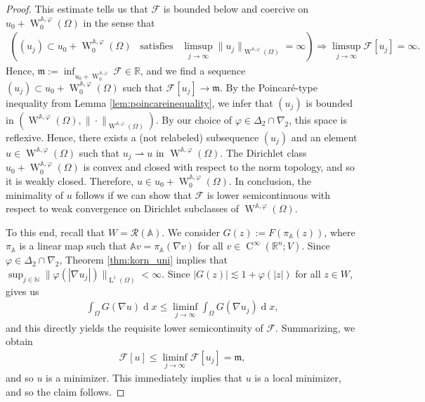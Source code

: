 \documentclass[a4paper,11pt]{amsart}
\numberwithin{equation}{section}
\newcommand{\R}{\mathbb{R}}
\newcommand{\lebe}{\operatorname{L}}
\newcommand{\dif}{\operatorname{d}\!}
\newcommand{\sobo}{\operatorname{W}}
\newcommand{\hold}{\operatorname{C}}
\begin{document}
\begin{proof}
		This estimate tells us that $\mathcal{F}$ is bounded below and coercive  on $u_{0}+\sobo_{0}^{\mathbb{A},\varphi}(\Omega)$ in the sense that 
		\begin{align*}
			((u_{j})\subset u_{0}+\sobo_{0}^{\mathbb{A},\varphi}(\Omega)\;\;\;\text{satisfies}\;\;\;\limsup_{j\to\infty}\|u_{j}\|_{\sobo^{\mathbb{A},\varphi}(\Omega)}=\infty)\Rightarrow \limsup_{j\to\infty}\mathcal{F}[u_{j}]=\infty. 
		\end{align*}
		Hence, $\mathfrak{m}:=\inf_{u_{0}+\sobo_{0}^{\mathbb{A},\varphi}}\mathcal{F}\in\R$, and we find a sequence $(u_{j})\subset u_{0}+\sobo_{0}^{\mathbb{A},\varphi}(\Omega)$ such that $\mathcal{F}[u_{j}]\to\mathfrak{m}$. By the Poincar\'{e}-type inequality from Lemma \ref{lem:poincareinequality}, we infer that $(u_{j})$ is bounded in $(\sobo^{\mathbb{A},\varphi}(\Omega),\|\cdot\|_{\sobo^{\mathbb{A},\varphi}(\Omega)})$. By our choice of $\varphi\in\Delta_{2}\cap\nabla_{2}$, this space is reflexive. Hence, there exists a (not relabeled) subsequence $(u_{j})$ and an element $u\in\sobo^{\mathbb{A},\varphi}(\Omega)$ such that $u_{j}\rightharpoonup u$ in $\sobo^{\mathbb{A},\varphi}(\Omega)$. The Dirichlet class $u_{0}+\sobo_{0}^{\mathbb{A},\varphi}(\Omega)$ is convex and closed with respect to the norm topology, and so it is weakly closed. Therefore, $u\in u_{0}+\sobo_{0}^{\mathbb{A},\varphi}(\Omega)$. In conclusion, the minimality of $u$ follows if we can show that $\mathcal{F}$ is lower semicontinuous with respect to weak convergence on Dirichlet subclasses of $\sobo^{\mathbb{A},\varphi}(\Omega)$. 
		
		To this end, recall that $W=\mathscr{R}(\mathbb{A})$. We consider $G(z):=F(\pi_{\mathbb{A}}(z))$, where $\pi_{\mathbb{A}}$ is a linear map such that $\mathbb{A}v=\pi_{\mathbb{A}}(\nabla v)$ for all $v\in\hold^{\infty}(\R^{n};V)$. Since $\varphi\in\Delta_{2}\cap\nabla_{2}$, Theorem \ref{thm:korn_uni} implies that $\sup_{j\in\mathbb{N}}\|\varphi(|\nabla u_{j}|)\|_{\lebe^{1}(\Omega)}<\infty$. Since $|G(z)|\lesssim 1+\varphi(|z|)$ for all $z\in W$, \cite[Prop. 10.9]{gmeineder_quasiconvex_2024} gives us
		\begin{align*}
			\int_{\Omega}G(\nabla u)\dif x \leq \liminf_{j\to\infty}\int_{\Omega}G(\nabla u_{j})\dif x,
		\end{align*}
		and this directly yields the requisite lower semicontinuity of $\mathcal{F}$. Summarizing, we obtain 
		\begin{align*}
			\mathcal{F}[u] \leq \liminf_{j\to\infty}\mathcal{F}[u_{j}] = \mathfrak{m}, 
		\end{align*}
		and so $u$ is a minimizer. This immediately implies that $u$ is a local minimizer, and so the claim follows.
	\end{proof}
\end{document}
